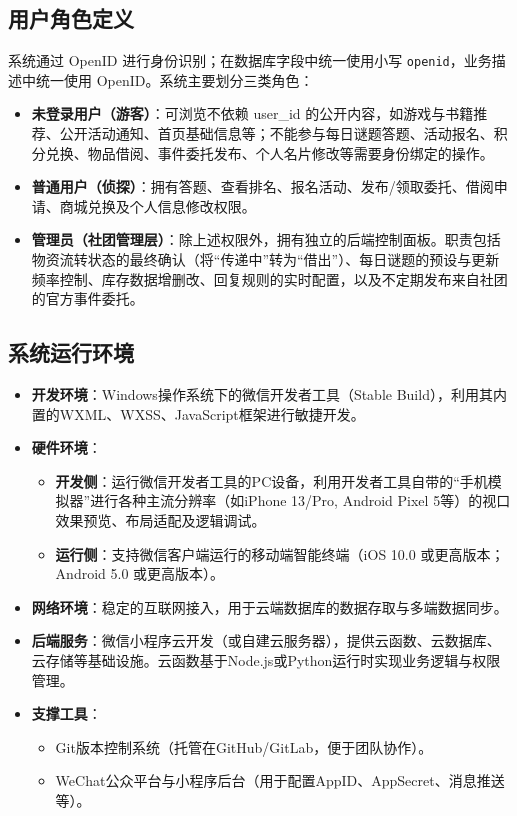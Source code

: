 \documentclass[a4paper,12pt]{article}
\begin{document}
\subsection{用户角色定义}
系统通过 OpenID 进行身份识别；在数据库字段中统一使用小写 \texttt{openid}，业务描述中统一使用 OpenID。系统主要划分三类角色：
\begin{itemize}
    \item \textbf{未登录用户（游客）}：可浏览不依赖 user\_id 的公开内容，如游戏与书籍推荐、公开活动通知、首页基础信息等；不能参与每日谜题答题、活动报名、积分兑换、物品借阅、事件委托发布、个人名片修改等需要身份绑定的操作。
    \item \textbf{普通用户（侦探）}：拥有答题、查看排名、报名活动、发布/领取委托、借阅申请、商城兑换及个人信息修改权限。
    \item \textbf{管理员（社团管理层）}：除上述权限外，拥有独立的后端控制面板。职责包括物资流转状态的最终确认（将“传递中”转为“借出”）、每日谜题的预设与更新频率控制、库存数据增删改、回复规则的实时配置，以及不定期发布来自社团的官方事件委托。
\end{itemize}

\subsection{系统运行环境}
\begin{itemize}
    \item \textbf{开发环境}：Windows操作系统下的微信开发者工具（Stable Build），利用其内置的WXML、WXSS、JavaScript框架进行敏捷开发。
    \item \textbf{硬件环境}：
        \begin{itemize}
            \item \textbf{开发侧}：运行微信开发者工具的PC设备，利用开发者工具自带的“手机模拟器”进行各种主流分辨率（如iPhone 13/Pro, Android Pixel 5等）的视口效果预览、布局适配及逻辑调试。
            \item \textbf{运行侧}：支持微信客户端运行的移动端智能终端（iOS 10.0 或更高版本；Android 5.0 或更高版本）。
        \end{itemize}
    \item \textbf{网络环境}：稳定的互联网接入，用于云端数据库的数据存取与多端数据同步。
    \item \textbf{后端服务}：微信小程序云开发（或自建云服务器），提供云函数、云数据库、云存储等基础设施。云函数基于Node.js或Python运行时实现业务逻辑与权限管理。
    \item \textbf{支撑工具}：
        \begin{itemize}
            \item Git版本控制系统（托管在GitHub/GitLab，便于团队协作）。
            \item WeChat公众平台与小程序后台（用于配置AppID、AppSecret、消息推送等）。
        \end{itemize}
\end{itemize}
\end{document}
